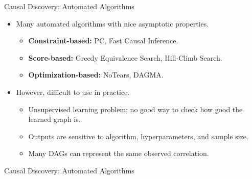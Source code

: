\documentclass[aspectratio=169]{beamer}
\begin{document}
\begin{frame}{Causal Discovery: Automated Algorithms}
	\begin{itemize}
		\item Many automated algorithms with nice asymptotic properties.
			\begin{itemize}
				\item \textbf{Constraint-based:} PC, Fast Causal Inference.
				\item \textbf{Score-based:} Greedy Equivalence Search, Hill-Climb Search.
				\item \textbf{Optimization-based:} NoTears, DAGMA.
			\end{itemize}
		\item However, difficult to use in practice.
			\begin{itemize}
				\item Unsupervised learning problem; no good way to check how good the learned graph is.
				\item Outputs are sensitive to algorithm, hyperparameters, and sample size.
				\item Many DAGs can represent the same observed correlation.
			\end{itemize}
	\end{itemize}
\end{frame}

\begin{frame}{Causal Discovery: Automated Algorithms}
\end{frame}
\end{document}
